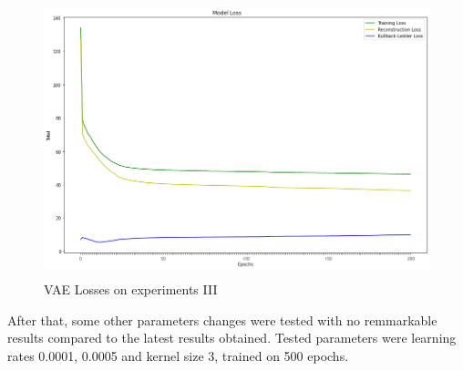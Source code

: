 \begin{figure}[ht]
    \centering
    \includegraphics[width = 14cm, height=8cm]{images/vae-loss-128pixels-200epochs}
    \caption[VAE Losses on experiments III]{VAE Losses on experiments III}
    \label{fig:vae-loss-128pixels-200epochs}
\end{figure}

After that, some other parameters changes were tested with no remmarkable results compared to the latest results obtained. Tested parameters were learning rates 0.0001, 0.0005 and kernel size 3, trained on 500 epochs.